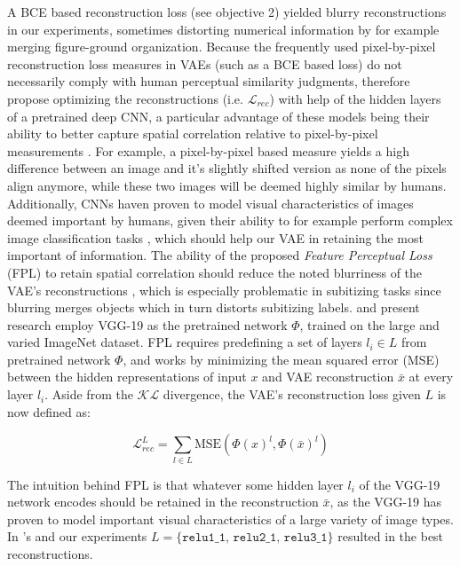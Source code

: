 \documentclass[twocolumn]{article}
\begin{document}
A BCE based reconstruction loss (see objective 2) yielded blurry reconstructions in our experiments, sometimes distorting numerical information by for example merging figure-ground organization.
Because the frequently used pixel-by-pixel reconstruction loss measures
in VAEs (such as a BCE based loss) do not necessarily comply with human perceptual similarity
judgments, \citet{hou2017deep} therefore propose optimizing the reconstructions (i.e. \(\mathcal{L}_{rec}\)) with help of the hidden layers of a pretrained deep CNN, a particular advantage of these models being their ability to better capture spatial correlation relative to pixel-by-pixel measurements \citep{hou2017deep}. For example, a pixel-by-pixel based measure yields a high difference between an image and it's slightly shifted version as none of the pixels align anymore, while these two images will be deemed highly similar by humans.
Additionally, CNNs haven proven to model visual characteristics of
images deemed important by humans, given their ability to for example perform
complex image classification tasks \citep{krizhevsky2012imagenet}, which should help our VAE in retaining the most important of information.  The ability
of the proposed \emph{Feature Perceptual Loss} (FPL) to retain spatial
correlation should reduce the noted blurriness
\citep[see for example][]{larsen2015autoencoding} of the VAE's reconstructions \citep{hou2017deep}, which is
especially problematic in subitizing tasks since blurring merges objects
which in turn distorts subitizing labels. \citet{hou2017deep} and
present research employ VGG-19 \citep{simonyan2014very} as the
pretrained network \(\Phi\), trained on the large and varied ImageNet
\citep{russakovsky2015imagenet} dataset. FPL requires predefining a set
of layers \(l_i \in L\) from pretrained network \(\Phi\), and works by
minimizing the mean squared error (MSE) between the hidden
representations of input \(x\) and VAE reconstruction \(\bar{x}\) at
every layer \(l_i\). Aside from the \(\mathcal{KL}\) divergence, the
VAE's reconstruction loss given $L$ is now defined as:

\[ \mathcal{L}^{L}_{rec} = \sum_{l \in L}^{} \textrm{MSE}(\Phi(x)^{l}, \Phi(\bar{x})^{l})\]

\noindent The intuition behind FPL is that whatever some hidden layer \(l_i\) of
the VGG-19 network encodes should be retained in the reconstruction
\(\bar{x}\), as the VGG-19 has proven to model important visual
characteristics of a large variety of image types. In
\citet{hou2017deep}'s and our experiments
\(L = \{\texttt{relu1\_1, relu2\_1, relu3\_1\}}\) resulted in the best
reconstructions. 
\end{document}
